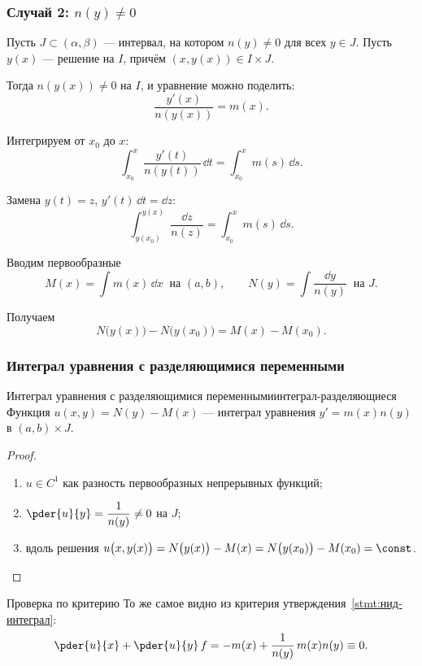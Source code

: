 \subsubsection*{Случай 2: $n(y) \neq 0$}

Пусть $J \subset (\alpha,\beta)$ --- интервал, на котором $n(y) \neq 0$
для всех $y \in J$. Пусть $y(x)$ --- решение на $I$, причём
$(x, y(x)) \in I \times J$.

Тогда $n(y(x)) \neq 0$ на $I$, и уравнение можно поделить:
\[
\frac{y'(x)}{n(y(x))} = m(x).
\]

Интегрируем от $x_0$ до $x$:
\[
\int_{x_0}^{x} \frac{y'(t)}{n(y(t))}\,\dd t = \int_{x_0}^{x} m(s)\,\dd s.
\]

Замена $y(t) = z$, $y'(t)\,\dd t = \dd z$:
\[
\int_{y(x_0)}^{y(x)} \frac{\dd z}{n(z)} = \int_{x_0}^{x} m(s)\,\dd s.
\]

Вводим первообразные
\[
M(x) = \int m(x)\,\dd x \ \text{ на } (a,b), \qquad
N(y) = \int \frac{\dd y}{n(y)} \ \text{ на } J.
\]

Получаем
\[
N\bigl(y(x)\bigr) - N\bigl(y(x_0)\bigr) = M(x) - M(x_0).
\]

\subsubsection*{Интеграл уравнения с разделяющимися переменными}

\begin{Statement}{Интеграл уравнения с разделяющимися переменными}{интеграл-разделяющиеся}
	Функция $u(x,y) = N(y) - M(x)$ --- интеграл уравнения $y' = m(x)n(y)$
	в $(a,b) \times J$.
\end{Statement}

\begin{proof}
	\begin{enumerate}
		\item $u \in C^1$ как разность первообразных непрерывных функций;
		\item $\pder{u}{y} = \dfrac{1}{n(y)} \neq 0$ на $J$;
		\item вдоль решения
		$u\bigl(x,y(x)\bigr) = N\bigl(y(x)\bigr) - M(x)
		= N\bigl(y(x_0)\bigr) - M(x_0) = \const$.
	\end{enumerate}
\end{proof}

\begin{Remark}[addon]{Проверка по критерию}{}
	То же самое видно из критерия утверждения~\ref{stmt:нид-интеграл}:
	\[
	\pder{u}{x} + \pder{u}{y}\, f
	= -m(x) + \frac{1}{n(y)}\,m(x)n(y) \equiv 0.
	\]
\end{Remark}

